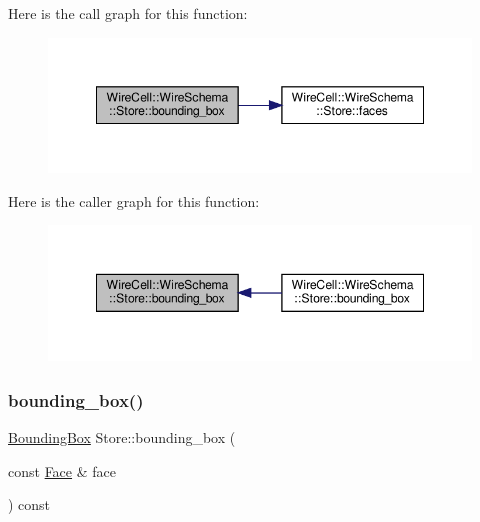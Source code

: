 Here is the call graph for this function\+:
\nopagebreak
\begin{figure}[H]
\begin{center}
\leavevmode
\includegraphics[width=348pt]{class_wire_cell_1_1_wire_schema_1_1_store_acfb80d41d1fe8264ea07c9d63a5202fe_cgraph}
\end{center}
\end{figure}
Here is the caller graph for this function\+:
\nopagebreak
\begin{figure}[H]
\begin{center}
\leavevmode
\includegraphics[width=348pt]{class_wire_cell_1_1_wire_schema_1_1_store_acfb80d41d1fe8264ea07c9d63a5202fe_icgraph}
\end{center}
\end{figure}
\mbox{\label{class_wire_cell_1_1_wire_schema_1_1_store_acf8cba891cf3ac52d76bcb4d3c59027d}} 
\subsubsection{\texorpdfstring{bounding\+\_\+box()}{bounding\_box()}\hspace{0.1cm}{\footnotesize\ttfamily [2/3]}}
{\footnotesize\ttfamily \hyperlink{class_wire_cell_1_1_bounding_box}{Bounding\+Box} Store\+::bounding\+\_\+box (\begin{DoxyParamCaption}\item[{const \hyperlink{struct_wire_cell_1_1_wire_schema_1_1_face}{Face} \&}]{face }\end{DoxyParamCaption}) const}



